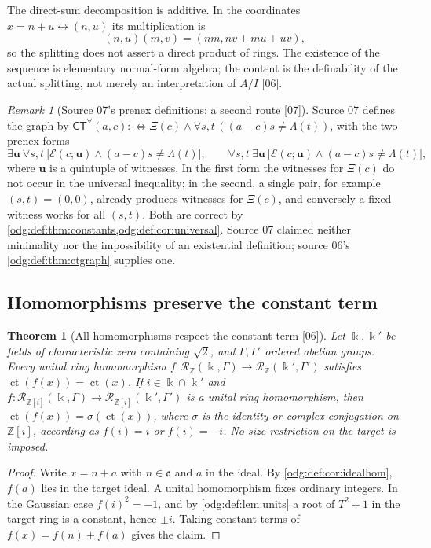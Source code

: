 \documentclass[11pt,oneside]{article}
\numberwithin{equation}{section}
\newtheorem{theorem}{Theorem}[section]
\theoremstyle{definition}
\theoremstyle{remark}
\newtheorem{remark}[remark]{Remark}
\newcommand{\Z}{\mathbb Z}
\newcommand{\ct}{\operatorname{ct}}
\newcommand{\src}[1]{\textup{\textsf{\small[#1]}}}
\begin{document}
The direct-sum decomposition is additive. In the coordinates
$x=n+u\leftrightarrow(n,u)$ its multiplication is
\[
 (n,u)(m,v)=(nm,nv+mu+uv),
\]
so the splitting does not assert a direct product of rings.
The existence of the sequence is elementary normal-form algebra; the content
is the definability of the actual splitting, not merely an interpretation of
$A/I$ \src{06}.

\begin{remark}[Source 07's prenex definitions; a second route \src{07}]\label{odg:def:rem:sigma2}
Source 07 defines the graph by $\mathsf{CT}^{\forall}(a,c):\Leftrightarrow
\Xi(c)\wedge\forall s,t\,((a-c)s\ne\Lambda(t))$, with the two prenex forms
\[
 \exists\mathbf u\ \forall s,t\ \bigl[\mathcal E(c;\mathbf u)\wedge
 (a-c)s\ne\Lambda(t)\bigr],\qquad
 \forall s,t\ \exists\mathbf u\ \bigl[\mathcal E(c;\mathbf u)\wedge
 (a-c)s\ne\Lambda(t)\bigr],
\]
where $\mathbf u$ is a quintuple of witnesses. In the first form the witnesses
for $\Xi(c)$ do not occur in the universal inequality; in the second, a
single pair, for example $(s,t)=(0,0)$, already produces witnesses for
$\Xi(c)$, and conversely a
fixed witness works for all $(s,t)$. Both are correct by
\cref{odg:def:thm:constants,odg:def:cor:universal}. Source 07 claimed neither
minimality nor the impossibility of an existential definition; source 06's
\cref{odg:def:thm:ctgraph} supplies one.
\end{remark}

\subsection{Homomorphisms preserve the constant term}

\begin{theorem}[All homomorphisms respect the constant term \src{06}]\label{odg:def:thm:homct}
Let $\Bbbk,\Bbbk'$ be fields of characteristic zero containing $\sqrt2$, and
$\Gamma,\Gamma'$ ordered abelian groups. Every unital ring homomorphism
$f:\mathcal R_\Z(\Bbbk,\Gamma)\to\mathcal R_\Z(\Bbbk',\Gamma')$ satisfies
$\ct(f(x))=\ct(x)$. If $i\in\Bbbk\cap\Bbbk'$ and
$f:\mathcal R_{\Z[i]}(\Bbbk,\Gamma)\to\mathcal R_{\Z[i]}(\Bbbk',\Gamma')$ is a
unital ring homomorphism, then $\ct(f(x))=\sigma(\ct(x))$, where $\sigma$ is
the identity or complex conjugation on $\Z[i]$, according as $f(i)=i$ or
$f(i)=-i$. No size restriction on the target is imposed.
\end{theorem}
\begin{proof}
Write $x=n+a$ with $n\in\mathfrak o$ and $a$ in the ideal. By
\cref{odg:def:cor:idealhom}, $f(a)$ lies in the target ideal. A unital
homomorphism fixes ordinary integers. In the Gaussian case $f(i)^2=-1$, and by
\cref{odg:def:lem:units} a root of $T^2+1$ in the target ring is a constant,
hence $\pm i$. Taking constant terms of $f(x)=f(n)+f(a)$ gives the claim.
\end{proof}
\end{document}
